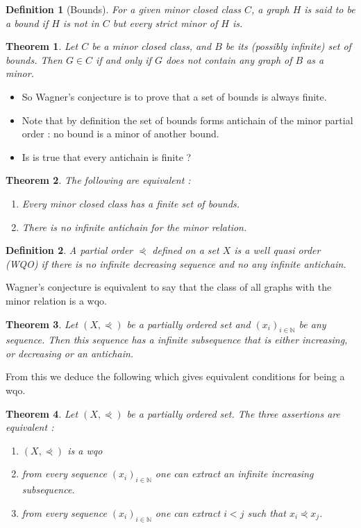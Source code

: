 \documentclass[12pt,a4paper]{article}
\def\N{\mathbb{N}}
\newtheorem{theorem}{Theorem}
\newtheorem{definition}{Definition}
\begin{document}
\begin{definition}[Bounds]
For a given minor closed class $C$, a graph $H$ is said to be a bound if $H$ is not in $C$
but every strict minor of $H$ is.
\end{definition}

\begin{theorem}
Let $C$ be a minor closed class, and $B$ be its (possibly infinite) set of bounds. Then
$G \in C$ if and only if $G$ does not contain any graph of $B$ as a minor.
\end{theorem}

\begin{itemize}
\item So Wagner’s conjecture is to prove that a set of bounds is always finite.
\item Note that by definition the set of bounds forms antichain of the minor partial
order : no bound is a minor of another bound.
\item Is is true that every antichain is finite ?
\end{itemize}

\begin{theorem}
The following are equivalent :
\begin{enumerate}
\item Every minor closed class has a finite set of bounds.
\item There is no infinite antichain for the minor relation.
\end{enumerate}
\end{theorem}

\begin{definition}
A partial order $\curlyeqprec$ defined on a set $X$ is a well quasi order (WQO) if there is no
infinite decreasing sequence and no any infinite antichain.
\end{definition}

Wagner’s conjecture is equivalent to say that the class of all graphs with the minor
relation is a wqo.

\begin{theorem}
Let $( X , \curlyeqprec)$ be a partially ordered set and $( x_i )_{i \in \N}$ be any sequence. Then this
sequence has a infinite subsequence that is either increasing, or decreasing or an antichain.
\end{theorem}

From this we deduce the following which gives equivalent conditions for being a
wqo.

\begin{theorem}
Let $( X , \curlyeqprec)$ be a partially ordered set. The three assertions are equivalent :
\begin{enumerate}
\item $( X , \curlyeqprec)$ is a wqo
\item from every sequence $( x_i )_{i \in \N}$ one can extract an infinite increasing
subsequence.
\item from every sequence $( x_i )_{i \in \N}$ one can extract $i < j$ such that $x_i \curlyeqprec x_j$.
\end{enumerate}
\end{theorem}
\end{document}
